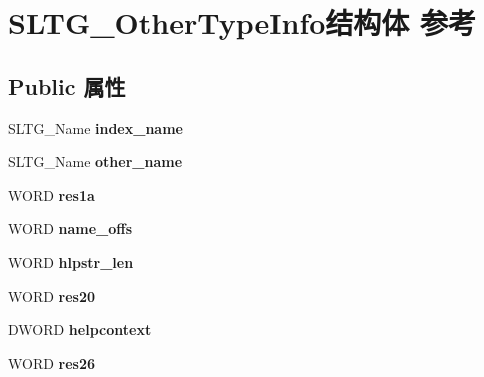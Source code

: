 \hypertarget{struct_s_l_t_g___other_type_info}{}\section{S\+L\+T\+G\+\_\+\+Other\+Type\+Info结构体 参考}
\label{struct_s_l_t_g___other_type_info}
\subsection*{Public 属性}
\begin{DoxyCompactItemize}
\item 
\mbox{\label{struct_s_l_t_g___other_type_info_a640be9777952082b49401535379043fe}} 
S\+L\+T\+G\+\_\+\+Name {\bfseries index\+\_\+name}
\item 
\mbox{\label{struct_s_l_t_g___other_type_info_ad95da2affba2acf2530d5a113f47e743}} 
S\+L\+T\+G\+\_\+\+Name {\bfseries other\+\_\+name}
\item 
\mbox{\label{struct_s_l_t_g___other_type_info_a4b07cd923af7ac616bc4d594d2797838}} 
W\+O\+RD {\bfseries res1a}
\item 
\mbox{\label{struct_s_l_t_g___other_type_info_a29ca210b2416d93dcea4401f8184a089}} 
W\+O\+RD {\bfseries name\+\_\+offs}
\item 
\mbox{\label{struct_s_l_t_g___other_type_info_a1cb965366278098a23c0ae3603752397}} 
W\+O\+RD {\bfseries hlpstr\+\_\+len}
\item 
\mbox{\label{struct_s_l_t_g___other_type_info_a64ee9125ad3634ea3b326f1b5badb3cf}} 
W\+O\+RD {\bfseries res20}
\item 
\mbox{\label{struct_s_l_t_g___other_type_info_afd2b163e68fd34d58a98ee6a2fe26799}} 
D\+W\+O\+RD {\bfseries helpcontext}
\item 
\mbox{\label{struct_s_l_t_g___other_type_info_a94b189e9ed617554d452dad524424410}} 
W\+O\+RD {\bfseries res26}

\end{DoxyCompactItemize}
